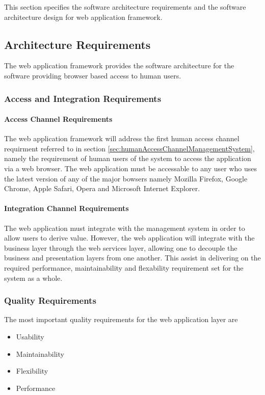 This section specifies the software architecture requirements and the software
architecture design for web application framework.

\subsection{Architecture Requirements}
The web application framework provides the software architecture for the software
providing browser based access to human users.

\subsubsection{Access and Integration Requirements}
\paragraph{Access Channel Requirements}
The web application framework will address the first human access channel requirment
referred to in section \ref{sec:humanAccessChannelManagementSystem},
namely the requirement of human users of the system to access the application
via a web browser. The web application must be accessable to any user who uses
the latest version of any of the major bowsers namely Mozilla Firefox, 
Google Chrome, Apple Safari, Opera and Microsoft Internet Explorer.

\paragraph{Integration Channel Requirements}
The web application must integrate with the management system in order to allow
users to derive value. However, the web application will integrate with the
business layer through the web services layer, allowing one to decouple the
business and presentation layers from one another. This assist in delivering on
the required performance, maintainability and flexability requirement set for
the system as a whole.

\subsubsection{Quality Requirements}
The most important quality requirements for the web application layer are
\begin{itemize}
	\item Usability
	\item Maintainability
	\item Flexibility
	\item Performance
\end{itemize}
	
